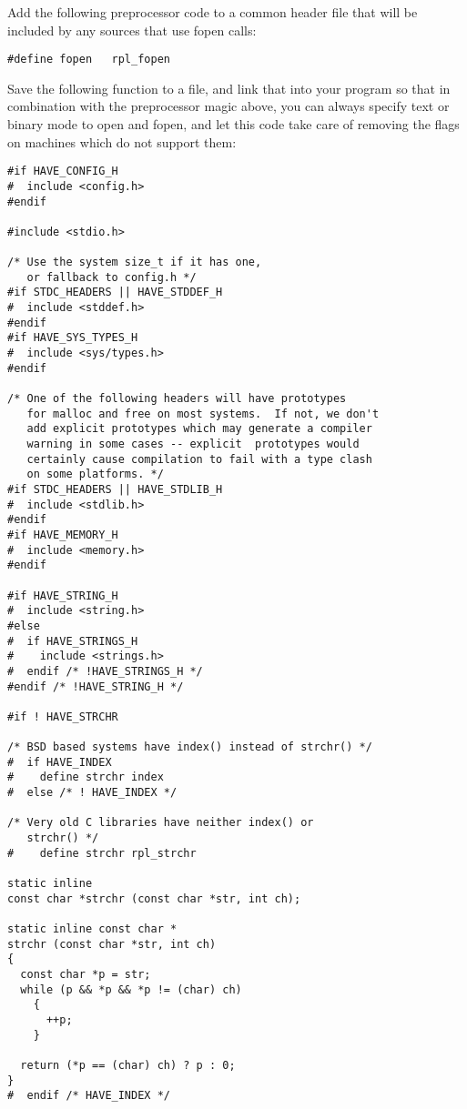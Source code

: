 \begin{description}
Add the following preprocessor code to a common header file that will be included by any sources that use fopen calls:

 	

\begin{Verbatim}[frame=single]
#define fopen	rpl_fopen
\end{Verbatim}

Save the following function to a file, and link that into your program so that in combination with the preprocessor magic above, you can always specify text or binary mode to open and fopen, and let this code take care of removing the flags on machines which do not support them:

 	



\begin{Verbatim}[frame=single]
#if HAVE_CONFIG_H
#  include <config.h>
#endif

#include <stdio.h>

/* Use the system size_t if it has one, 
   or fallback to config.h */
#if STDC_HEADERS || HAVE_STDDEF_H
#  include <stddef.h>
#endif
#if HAVE_SYS_TYPES_H
#  include <sys/types.h>
#endif

/* One of the following headers will have prototypes 
   for malloc and free on most systems.  If not, we don't 
   add explicit prototypes which may generate a compiler 
   warning in some cases -- explicit  prototypes would 
   certainly cause compilation to fail with a type clash 
   on some platforms. */
#if STDC_HEADERS || HAVE_STDLIB_H
#  include <stdlib.h>
#endif
#if HAVE_MEMORY_H
#  include <memory.h>
#endif

#if HAVE_STRING_H
#  include <string.h>
#else
#  if HAVE_STRINGS_H
#    include <strings.h>
#  endif /* !HAVE_STRINGS_H */
#endif /* !HAVE_STRING_H */

#if ! HAVE_STRCHR

/* BSD based systems have index() instead of strchr() */
#  if HAVE_INDEX
#    define strchr index
#  else /* ! HAVE_INDEX */

/* Very old C libraries have neither index() or 
   strchr() */
#    define strchr rpl_strchr

static inline 
const char *strchr (const char *str, int ch);

static inline const char *
strchr (const char *str, int ch)
{
  const char *p = str;
  while (p && *p && *p != (char) ch)
    {
      ++p;
    }

  return (*p == (char) ch) ? p : 0;
}
#  endif /* HAVE_INDEX */


\end{Verbatim}
\end{description}
